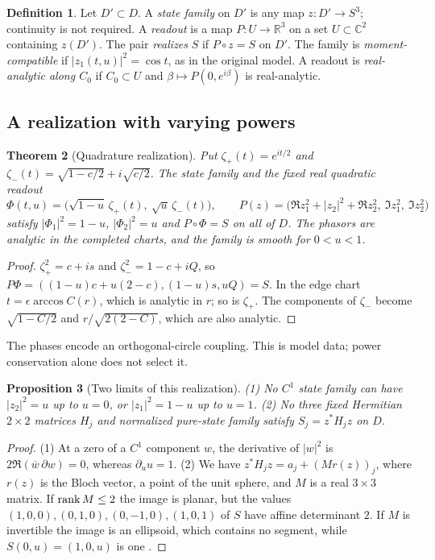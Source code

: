 \documentclass[11pt]{article}
\newtheorem{theorem}{Theorem}[section]
\newtheorem{proposition}[theorem]{Proposition}
\theoremstyle{definition}\newtheorem{definition}[theorem]{Definition}
\theoremstyle{remark}\newtheorem{remark}[theorem]{Remark}
\newcommand{\R}{\mathbb R}\newcommand{\C}{\mathbb C}\newcommand{\Z}{\mathbb Z}
\begin{document}
\begin{definition}\label{def:realization}
Let $D'\subset D$. A \emph{state family} on $D'$ is any map $z:D'\to S^3$;
continuity is not required. A \emph{readout} is a map $P:U\to\R^3$ on a set
$U\subset\C^2$ containing $z(D')$. The pair \emph{realizes} $S$ if
$P\circ z=S$ on $D'$. The family is \emph{moment-compatible} if
$|z_1(t,u)|^2=\cos t$, as in the original model. A readout is
\emph{real-analytic along $C_0$} if $C_0\subset U$ and $\beta\mapsto P(0,e^{i\beta})$
is real-analytic.
\end{definition}

\subsection{A realization with varying powers}
\begin{theorem}[Quadrature realization]\label{thm:realization}
Put $\zeta_+(t)=e^{it/2}$ and $\zeta_-(t)=\sqrt{1-c/2}+i\sqrt{c/2}$. The state
family and the fixed real quadratic readout
\[
 \Phi(t,u)=\bigl(\sqrt{1-u}\,\zeta_+(t),\ \sqrt u\,\zeta_-(t)\bigr),\qquad
 P(z)=\bigl(\Re z_1^2+|z_2|^2+\Re z_2^2,\ \Im z_1^2,\ \Im z_2^2\bigr)
\]
satisfy $|\Phi_1|^2=1-u$, $|\Phi_2|^2=u$ and $P\circ\Phi=S$ on all of $D$. The
phasors are analytic in the completed charts, and the family is smooth for
$0<u<1$.
\end{theorem}
\begin{proof}
$\zeta_+^2=c+is$ and $\zeta_-^2=1-c+iQ$, so
$P\Phi=((1-u)c+u(2-c),(1-u)s,uQ)=S$. In the edge chart
$t=\epsilon\arccos C(r)$, which is analytic in $r$; so is $\zeta_+$. The
components of $\zeta_-$ become $\sqrt{1-C/2}$ and $r/\sqrt{2(2-C)}$, which are
also analytic.
\end{proof}
The phases encode an orthogonal-circle coupling. This is model data; power
conservation alone does not select it.

\begin{proposition}[Two limits of this realization]\label{prop:twoobs}
(1) No $C^1$ state family can have $|z_2|^2=u$ up to $u=0$, or $|z_1|^2=1-u$ up
to $u=1$.
(2) No three fixed Hermitian $2\times2$ matrices $H_j$ and normalized pure-state
family satisfy $S_j=z^*H_jz$ on $D$.
\end{proposition}
\begin{proof}
(1) At a zero of a $C^1$ component $w$, the derivative of $|w|^2$ is
$2\Re(\overline w\,\partial w)=0$, whereas $\partial_u u=1$.
(2) We have $z^*H_jz=a_j+(Mr(z))_j$, where $r(z)$ is the Bloch vector, a point
of the unit sphere, and $M$ is a real $3\times3$ matrix. If $\operatorname{rank} M\leq2$ the
image is planar, but the values $(1,0,0),(0,1,0),(0,-1,0),(1,0,1)$ of $S$ have
affine determinant $2$. If $M$ is invertible the image is an ellipsoid, which
contains no segment, while $S(0,u)=(1,0,u)$ is one \cite{bloch}.
\end{proof}
\end{document}

